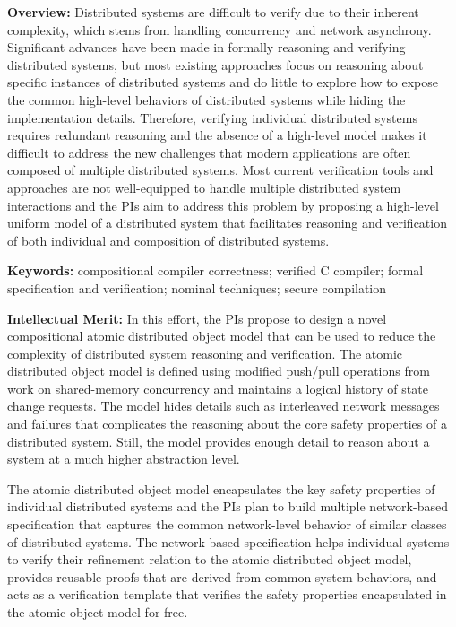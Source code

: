 
{\bf Overview:} Distributed systems are difficult to verify due to
their inherent complexity, which stems from handling concurrency and
network asynchrony.  Significant advances have been made in formally
reasoning and verifying distributed systems, but most existing
approaches focus on reasoning about specific instances of distributed
systems and do little to explore how to expose the common high-level
behaviors of distributed systems while hiding the implementation
details.  Therefore, verifying individual distributed systems requires
redundant reasoning and the absence of a high-level model makes it
difficult to address the new challenges that modern applications are
often composed of multiple distributed systems.  Most current
verification tools and approaches are not well-equipped to handle
multiple distributed system interactions and the PIs aim to address
this problem by proposing a high-level uniform model of a distributed
system that facilitates reasoning and verification of both individual
and composition of distributed systems.

{\bf Keywords:} compositional compiler correctness; verified C compiler;
formal specification and verification; nominal techniques; 
secure compilation

{\bf Intellectual Merit:} In this effort, the PIs propose to design a
novel compositional atomic distributed object model that can be used
to reduce the complexity of distributed system reasoning and
verification. The atomic distributed object model is defined using
modified push/pull operations from work on shared-memory concurrency
and maintains a logical history of state change requests. The model
hides details such as interleaved network messages and failures that
complicates the reasoning about the core safety properties of a
distributed system. Still, the model provides enough detail to reason
about a system at a much higher abstraction level.

The atomic distributed object model encapsulates the key safety
properties of individual distributed systems and the PIs plan to build
multiple network-based specification that captures the common
network-level behavior of similar classes of distributed systems.  The
network-based specification helps individual systems to verify their
refinement relation to the atomic distributed object model, provides
reusable proofs that are derived from common system behaviors, and
acts as a verification template that verifies the safety properties
encapsulated in the atomic object model for free.

